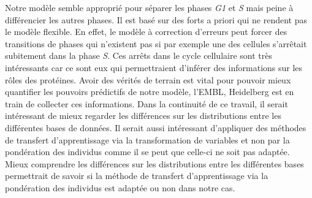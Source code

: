 \documentclass{article}
\begin{document}
Notre modèle semble approprié pour séparer les phases \textit{G1} et \textit{S} mais peine à différencier les autres phases. Il est basé sur des forts a priori qui ne rendent pas le modèle flexible. En effet, le modèle à correction d'erreurs peut forcer des transitions de phases qui n'existent pas si par exemple une des cellules s'arrêtait subitement dans la phase \textit{S}. Ces arrêts dans le cycle cellulaire sont très intéressants car ce sont eux qui permettraient d'inférer des informations sur les rôles des protéines. Avoir des vérités de terrain est vital pour pouvoir mieux quantifier les pouvoirs prédictifs de notre modèle, l'EMBL, Heidelberg est en train de collecter ces informations. Dans la continuité de ce travail, il serait intéressant de mieux regarder les différences sur les distributions entre les différentes bases de données. Il serait aussi intéressant d'appliquer des méthodes de transfert d'apprentissage via la transformation de variables et non par la pondération des individus comme il se peut que celle-ci ne soit pas adaptée. Mieux comprendre les différences sur les distributions entre les différentes bases permettrait de savoir si la méthode de transfert d'apprentissage via la pondération des individus est adaptée ou non dans notre cas.
\end{document}
